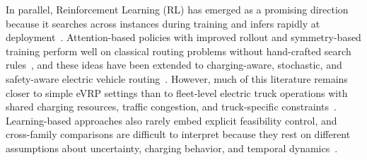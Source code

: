 \documentclass[journal]{IEEEtran}
\begin{document}
In parallel, Reinforcement Learning (RL) has emerged as a promising direction~\cite{evgnn} because it searches across instances during training and infers rapidly at deployment~\citep{kool2018attention}. Attention-based policies with improved rollout and symmetry-based training perform well on classical routing problems without hand-crafted search rules~\citep{yang2025neural}, and these ideas have been extended to charging-aware, stochastic, and safety-aware electric vehicle routing~\cite{BASSO2022102496}. However, much of this literature remains closer to simple eVRP settings than to fleet-level electric truck operations with shared charging resources, traffic congestion, and truck-specific constraints~\citep{lin2025}. Learning-based approaches also rarely embed explicit feasibility control, and cross-family comparisons are difficult to interpret because they rest on different assumptions about uncertainty, charging behavior, and temporal dynamics~\cite{lin2022}. 


\end{document}
